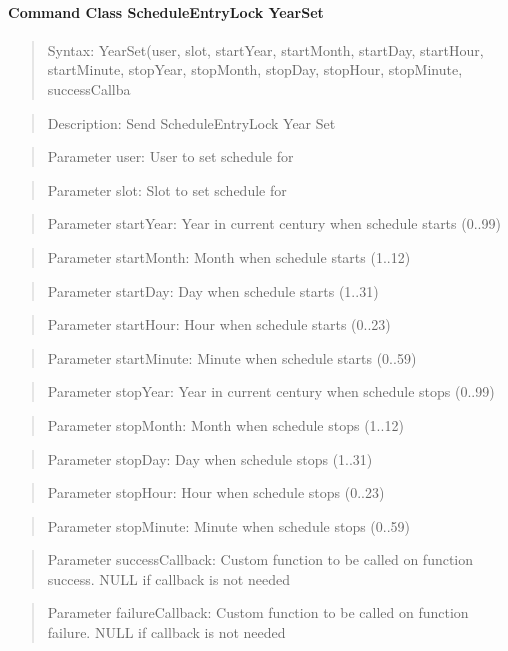 \paragraph {Command Class ScheduleEntryLock YearSet}
\begin{quote} Syntax: YearSet(user, slot, startYear, startMonth, startDay, startHour, startMinute, stopYear, stopMonth, stopDay, stopHour, stopMinute, successCallba\end{quote}
\begin{quote} Description: Send ScheduleEntryLock Year Set\end{quote}
\begin{quote} Parameter user: User to set schedule for\end{quote}
\begin{quote} Parameter slot: Slot to set schedule for\end{quote}
\begin{quote} Parameter startYear: Year in current century when schedule starts (0..99)\end{quote}
\begin{quote} Parameter startMonth: Month when schedule starts (1..12)\end{quote}
\begin{quote} Parameter startDay: Day when schedule starts (1..31)\end{quote}
\begin{quote} Parameter startHour: Hour when schedule starts (0..23)\end{quote}
\begin{quote} Parameter startMinute: Minute when schedule starts (0..59)\end{quote}
\begin{quote} Parameter stopYear: Year in current century when schedule stops (0..99)\end{quote}
\begin{quote} Parameter stopMonth: Month when schedule stops (1..12)\end{quote}
\begin{quote} Parameter stopDay: Day when schedule stops (1..31)\end{quote}
\begin{quote} Parameter stopHour: Hour when schedule stops (0..23)\end{quote}
\begin{quote} Parameter stopMinute: Minute when schedule stops (0..59)\end{quote}
\begin{quote} Parameter successCallback: Custom function to be called on function success. NULL if callback is not needed\end{quote}
\begin{quote} Parameter failureCallback: Custom function to be called on function failure. NULL if callback is not needed\end{quote}


